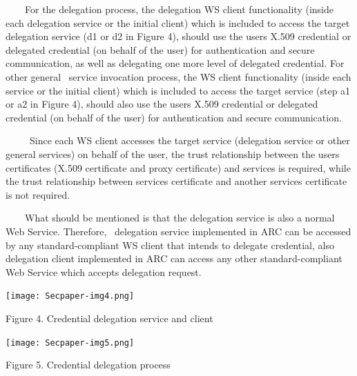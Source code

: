 \documentclass{article}
\begin{document}
\ \ \ \ For the delegation process, the delegation WS client
functionality (inside each delegation service or the initial client)
which is included to access the target delegation service (d1 or d2 in
Figure 4), should use the user{\textquotesingle}s X.509 credential or
delegated credential (on behalf of the user) for authentication and
secure communication, as well as delegating one more level of delegated
credential. For other general \ service invocation process, the WS
client functionality (inside each service or the initial client) which
is included to access the target service (step a1 or a2 in Figure 4),
should also use the user{\textquotesingle}s X.509 credential or
delegated credential (on behalf of the user) for authentication and
secure communication. 

\ \ \ \ \ Since each WS client accesses the target service (delegation
service or other general services) on behalf of the user, the trust
relationship between the user{\textquotesingle}s certificates (X.509
certificate and proxy certificate) and services is required, while the
trust relationship between service{\textquotesingle}s certificate and
another service{\textquotesingle}s certificate is not required.

\ \ \ \ What should be mentioned is that the delegation service is also
a normal Web Service. Therefore, \ delegation service implemented in
ARC can be accessed by any standard-compliant WS client that intends to
delegate credential, also delegation client implemented in ARC can
access any other standard-compliant Web Service which accepts
delegation request.

 

\begin{center}
\texttt{[image: Secpaper-img4.png]}
\end{center}

\bigskip


\bigskip

{\centering
Figure 4. Credential delegation service and client
\par}


\bigskip


\bigskip



\begin{center}
\texttt{[image: Secpaper-img5.png]}
\end{center}
{\centering
Figure 5. Credential delegation process
\par}


\bigskip
\end{document}
